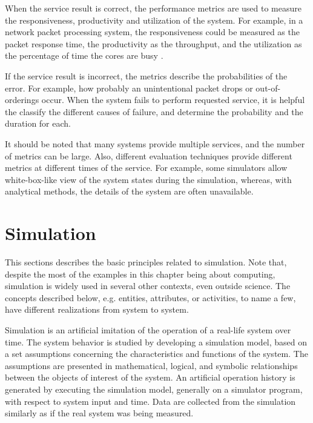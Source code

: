 When the service result is correct, the performance metrics are used to measure the responsiveness, productivity and utilization of the system. For example, in a network packet processing system, the responsiveness could be measured as the packet response time, the productivity as the throughput, and the utilization as the percentage of time the cores are busy \cite{Cavium FUNDAMENTALS}. \cite{jain:1991:AOCSPA}

If the service result is incorrect, the metrics describe the probabilities of the error. For example, how probably an unintentional packet drops or out-of-orderings occur. When the system fails to perform requested service, it is helpful the classify the different causes of failure, and determine the probability and the duration for each. \cite{jain:1991:AOCSPA}

It should be noted that many systems provide multiple services, and the number of metrics can be large. Also, different evaluation techniques provide different metrics at different times of the service. For example, some simulators allow white-box-like view of the system states during the simulation, whereas, with analytical methods, the details of the system are often unavailable. \cite{jain:1991:AOCSPA} \cite{TODO: find reference for the white-box black-box stuff}

\section{Simulation}
This sections describes the basic principles related to simulation. Note that, despite the most of the examples in this chapter being about computing, simulation is widely used in several other contexts, even outside science. The concepts described below, e.g. entities, attributes, or activities, to name a few, have different realizations from system to system.

Simulation is an artificial imitation of the operation of a real-life system over time. The system behavior is studied by developing a simulation model, based on a set assumptions concerning the characteristics and functions of the system. The assumptions are presented in mathematical, logical, and symbolic relationships between the objects of interest of the system. An artificial operation history is generated by executing the simulation model, generally on a simulator program, with respect to system input and time. Data are collected from the simulation similarly as if the real system was being measured.

